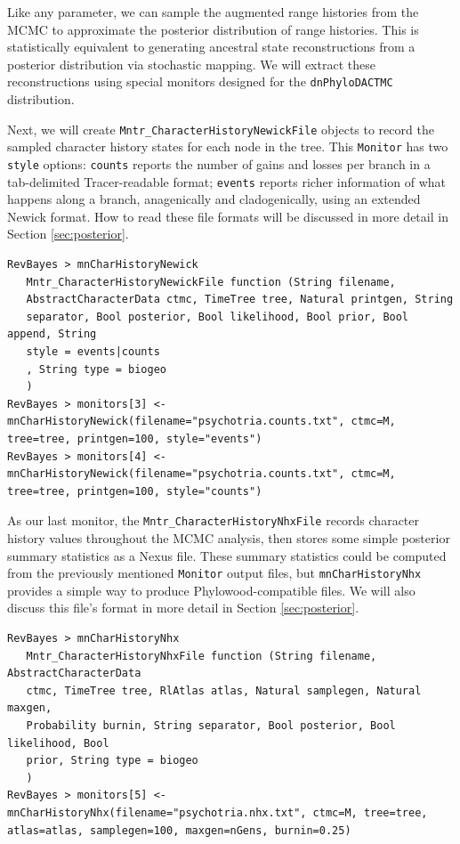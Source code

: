 \documentclass[11pt]{article}
\begin{document}
Like any parameter, we can sample the augmented range histories from the MCMC to approximate the posterior distribution of range histories.
This is statistically equivalent to generating ancestral state reconstructions from a posterior distribution via stochastic mapping.
We will extract these reconstructions using special monitors designed for the {\tt dnPhyloDACTMC} distribution.

Next, we will create {\tt Mntr\_CharacterHistoryNewickFile} objects to record the sampled character history states for each node in the tree.
This {\tt Monitor} has two {\tt style} options: {\tt counts} reports the number of gains and losses per branch in a tab-delimited Tracer-readable format;  {\tt events} reports richer information of what happens along a branch, anagenically and cladogenically, using an extended Newick format.
How to read these file formats will be discussed in more detail in Section \ref{sec:posterior}.

\begin{snugshade}
\begin{lstlisting}
RevBayes > mnCharHistoryNewick
   Mntr_CharacterHistoryNewickFile function (String filename,
   AbstractCharacterData ctmc, TimeTree tree, Natural printgen, String
   separator, Bool posterior, Bool likelihood, Bool prior, Bool append, String
   style = events|counts
   , String type = biogeo
   )
RevBayes > monitors[3] <- mnCharHistoryNewick(filename="psychotria.counts.txt", ctmc=M, tree=tree, printgen=100, style="events")
RevBayes > monitors[4] <- mnCharHistoryNewick(filename="psychotria.counts.txt", ctmc=M, tree=tree, printgen=100, style="counts")
\end{lstlisting}
\end{snugshade}

As our last monitor, the {\tt Mntr\_CharacterHistoryNhxFile} records character history values throughout the MCMC analysis, then stores some simple posterior summary statistics as a Nexus file.
These summary statistics could be computed from the previously mentioned {\tt Monitor} output files, but {\tt mnCharHistoryNhx} provides a simple way to produce Phylowood-compatible files.
We will also discuss this file's format in more detail in Section \ref{sec:posterior}.

\begin{snugshade}
\begin{lstlisting}
RevBayes > mnCharHistoryNhx
   Mntr_CharacterHistoryNhxFile function (String filename, AbstractCharacterData
   ctmc, TimeTree tree, RlAtlas atlas, Natural samplegen, Natural maxgen,
   Probability burnin, String separator, Bool posterior, Bool likelihood, Bool
   prior, String type = biogeo
   )
RevBayes > monitors[5] <- mnCharHistoryNhx(filename="psychotria.nhx.txt", ctmc=M, tree=tree, atlas=atlas, samplegen=100, maxgen=nGens, burnin=0.25)
\end{lstlisting}
\end{snugshade}
\end{document}

